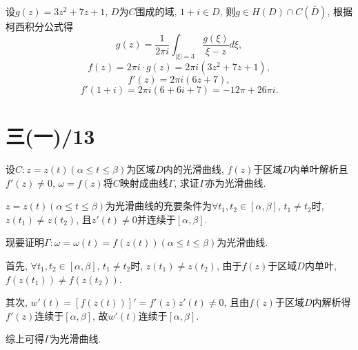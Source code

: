\documentclass[11pt,a4paper]{article}
\begin{document}
设$g(z)=3z^2+7z+1$, $D$为$C$围成的域, $1+i\in D$, 则$g\in H(D)\cap C(\overline{D})$, 根据柯西积分公式得
$$g(z)=\frac{1}{2\pi i}\int_{|\xi|=3}\frac{g(\xi)}{\xi-z}d\xi,$$
$$f(z)=2\pi i\cdot g(z)=2\pi i(3z^2+7z+1),$$
$$f'(z)=2\pi i(6z+7),$$
$$f'(1+i)=2\pi i(6+6i+7)=-12\pi+26\pi i.$$

\section{三(一)/13}
\begin{problem}
设$C:z=z(t)(\alpha\leqslant t\leqslant\beta)$为区域$D$内的光滑曲线, $f(z)$于区域$D$内单叶解析且$f'(z)\neq0$, $\omega=f(z)$将$C$映射成曲线$\Gamma$, 求证$\Gamma$亦为光滑曲线.
\end{problem}
$z=z(t)(\alpha\leqslant t\leqslant\beta)$为光滑曲线的充要条件为$\forall t_1,t_2\in[\alpha,\beta]$, $t_1\neq t_2$时, $z(t_1)\neq z(t_2)$, 且$z'(t)\neq 0$并连续于$[\alpha,\beta]$.\medskip

现要证明$\Gamma:\omega=\omega(t)=f(z(t))(\alpha\leqslant t\leqslant\beta)$为光滑曲线.

首先, $\forall t_1,t_2\in[\alpha,\beta]$, $t_1\neq t_2$时, $z(t_1)\neq z(t_2)$, 由于$f(z)$于区域$D$内单叶, $f(z(t_1))\neq f(z(t_2))$.

其次, $w'(t)=[f(z(t))]'=f'(z)z'(t)\neq 0$, 且由$f(z)$于区域$D$内解析得$f'(z)$连续于$[\alpha,\beta]$, 故$w'(t)$连续于$[\alpha,\beta]$.

综上可得$\Gamma$为光滑曲线.
\end{document}
